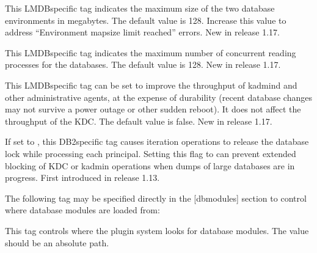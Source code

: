 \documentclass[letterpaper,10pt,english]{sphinxmanual}
\begin{document}
\begin{description}
\sphinxAtStartPar
This LMDB\sphinxhyphen{}specific tag indicates the maximum size of the two
database environments in megabytes.  The default value is 128.
Increase this value to address “Environment mapsize limit reached”
errors.  New in release 1.17.

\sphinxAtStartPar
This LMDB\sphinxhyphen{}specific tag indicates the maximum number of concurrent
reading processes for the databases.  The default value is 128.
New in release 1.17.

\sphinxAtStartPar
This LMDB\sphinxhyphen{}specific tag can be set to improve the throughput of
kadmind and other administrative agents, at the expense of
durability (recent database changes may not survive a power outage
or other sudden reboot).  It does not affect the throughput of the
KDC.  The default value is false.  New in release 1.17.

\sphinxAtStartPar
If set to , this DB2\sphinxhyphen{}specific tag causes iteration
operations to release the database lock while processing each
principal.  Setting this flag to  can prevent extended
blocking of KDC or kadmin operations when dumps of large databases
are in progress.  First introduced in release 1.13.

\end{description}

\sphinxAtStartPar
The following tag may be specified directly in the {[}dbmodules{]}
section to control where database modules are loaded from:
\begin{description}
\sphinxAtStartPar
This tag controls where the plugin system looks for database
modules.  The value should be an absolute path.

\end{description}
\end{document}
